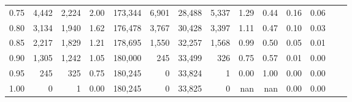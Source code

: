 \begin{tabular}{rrrrrrrrrrrrrr}
0.75 &   4,442 &  2,224 &    2.00 &  173,344 &    6,901 &  28,488 &   5,337 &  1.29 &  0.44 &  0.16 &      0.06 \\
0.80 &   3,134 &  1,940 &    1.62 &  176,478 &    3,767 &  30,428 &   3,397 &  1.11 &  0.47 &  0.10 &      0.03 \\
0.85 &   2,217 &  1,829 &    1.21 &  178,695 &    1,550 &  32,257 &   1,568 &  0.99 &  0.50 &  0.05 &      0.01 \\
0.90 &   1,305 &  1,242 &    1.05 &  180,000 &      245 &  33,499 &     326 &  0.75 &  0.57 &  0.01 &      0.00 \\
0.95 &     245 &    325 &    0.75 &  180,245 &        0 &  33,824 &       1 &  0.00 &  1.00 &  0.00 &      0.00 \\
1.00 &       0 &      1 &    0.00 &  180,245 &        0 &  33,825 &       0 &   nan &   nan &  0.00 &      0.00 \\
\bottomrule
\end{tabular}
